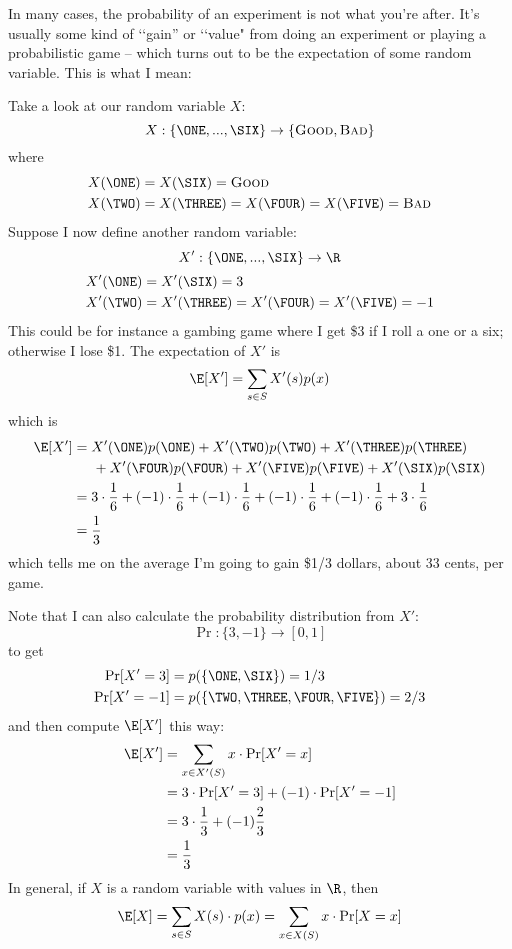 In many cases, the probability of an experiment is not what you're after.
It's usually some kind of \lq\lq gain''
or \lq\lq value"
from doing an experiment or playing a
probabilistic game -- which turns out to be the expectation of some
random variable.
This is what I mean:

Take a look at our random variable $X$:
\[
  X : \{ \ONE, ..., \SIX \} \rightarrow \{ \textsc{Good}, \textsc{Bad} \}
\]
where
\begin{align*}
  X(\ONE) &= X(\SIX) = \textsc{Good} \\
  X(\TWO) &= X(\THREE) = X(\FOUR) = X(\FIVE) = \textsc{Bad} 
\end{align*}
Suppose I now define another random variable:
\[
  X' : \{ \ONE, ..., \SIX \} \rightarrow \R
\]
\begin{align*}
  X'(\ONE) &= X'(\SIX) = 3 \\
  X'(\TWO) &= X'(\THREE) = X'(\FOUR) = X'(\FIVE) = -1 
\end{align*}
This could be for instance a gambing game where I get \$3
if I roll a one or a six; otherwise I lose \$1.
The expectation of $X'$ is
\[
  \E[X'] = \sum_{s \in S} X'(s) p(x)
\]
which is
\begin{align*}
  \E[X']
  &=
    X'(\ONE) p(\ONE)
    +X'(\TWO) p(\TWO)
    +X'(\THREE) p(\THREE)
  \\
  &\hspace{0.5cm}
    +X'(\FOUR) p(\FOUR)
    +X'(\FIVE) p(\FIVE)
    +X'(\SIX) p(\SIX)
  \\
  &=
         3 \cdot \frac{1}{6}
    + (-1) \cdot \frac{1}{6} 
    + (-1) \cdot \frac{1}{6}
    + (-1) \cdot \frac{1}{6} 
    + (-1) \cdot \frac{1}{6} 
    + 3    \cdot \frac{1}{6}
  \\
  &= \frac{1}{3}
\end{align*}
which tells me on the average I'm going to gain \$1/3 dollars, about 33 cents, per game.


Note that I can also calculate the probability distribution from $X'$:
\[
  \Pr: \{3, -1\} \rightarrow [0,1]
\]
to get
\begin{align*}
  \Pr[X' = 3] &= p(\{\ONE, \SIX \}) = 1/3 \\
  \Pr[X' = -1] &= p(\{ \TWO, \THREE, \FOUR, \FIVE \}) = 2/3 
\end{align*}
and then compute $\E[X']$ this way:
\begin{align*}
  \E[X']
  &= \sum_{x \in X'(S)} x \cdot \Pr[X' = x]
    \\
  &= 3 \cdot \Pr[X' = 3]
    + (-1) \cdot \Pr[X' = -1]
  \\
  &= 3 \cdot \frac{1}{3} + (-1) \frac{2}{3}
  \\
  &= \frac{1}{3}
\end{align*}
In general, if $X$ is a random variable with values in $\R$, then
\[
  \E[X] = \sum_{s \in S} X(s) \cdot p(x) = \sum_{x \in X(S)} x \cdot \Pr[X = x] 
\]

